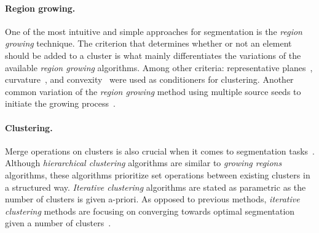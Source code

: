 \paragraph{\textbf{Region growing.}}
One of the most intuitive and simple approaches for segmentation is the \textit{region growing} technique. The criterion that determines whether or not an element should be added to a cluster is what mainly differentiates the variations of the available \textit{region growing} algorithms. Among other criteria: representative planes~\cite{kalvin1996superfaces}, curvature~\cite{lavoue2005new}, and convexity~\cite{chazelle1995strategies, sheffer2007shuffler} were used as conditioners for clustering. Another common variation of the \textit{region growing} method using multiple source seeds to initiate the growing process~\cite{levy2002least, sorkine2002bounded, eck1995multiresolution}.
\paragraph{\textbf{Clustering.}} %
Merge operations on clusters is also crucial when it comes to segmentation tasks~\cite {garland2001hierarchical, attene2006hierarchical, gelfand2004shape, sander2001texture}. Although \textit{hierarchical clustering} algorithms are similar to \textit{growing regions} algorithms, these algorithms prioritize set operations between existing clusters in a structured way. \textit{Iterative clustering} algorithms are stated as parametric as the number of clusters is given a-priori. As opposed to previous methods, \textit{iterative clustering} methods are focusing on converging towards optimal segmentation given a number of clusters~\cite{lloyd1982least, hart2000pattern, shlafman2002metamorphosis, cohen2004variational, wu2005structure}.
